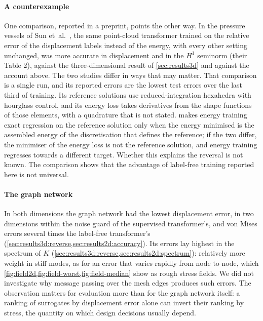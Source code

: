\paragraph{A counterexample}
One comparison, reported in a preprint, points the other way. In the pressure vessels of
Sun et~al.~\cite{Sun2026FEVessel}, the same point-cloud transformer trained on the relative
error of the displacement labels instead of the energy, with every other setting unchanged,
was more accurate in displacement and in the $H^1$ seminorm (their Table 2), against the
three-dimensional result of \cref{sec:results3d} and against the account above. The two
studies differ in ways that
may matter. That comparison is a single run, and its reported errors are the lowest test
errors over the last third of training. Its reference solutions use reduced-integration
hexahedra with hourglass control, and its energy loss takes derivatives from the shape
functions of those elements, with a quadrature that is not stated.  makes
energy training exact regression on the reference solution only when the energy minimised is
the assembled energy of the discretisation that defines the reference; if the two differ,
the minimiser of the energy loss is not the reference solution, and energy training
regresses towards a different target. Whether this explains the reversal is not known. The
comparison shows that the advantage of label-free training reported here is not universal.

\paragraph{The graph network}
In both dimensions the graph network had the lowest displacement error, in two dimensions
within the noise guard of the supervised transformer's, and von Mises errors several times
the label-free transformer's (\cref{sec:results3d:reverse,sec:results2d:accuracy}). Its
errors lay highest in the spectrum of $K$ (\cref{sec:results3d:reverse,sec:results2d:spectrum}):
relatively more weight in stiff modes, as for an error that varies rapidly from node to
node, which \cref{fig:field2d,fig:field-worst,fig:field-median} show as rough stress fields.
We did not investigate why message passing over the mesh edges produces such errors. The
observation matters for evaluation more than for the graph network itself: a ranking of
surrogates by displacement error alone can invert their ranking by stress, the quantity on
which design decisions usually depend.

